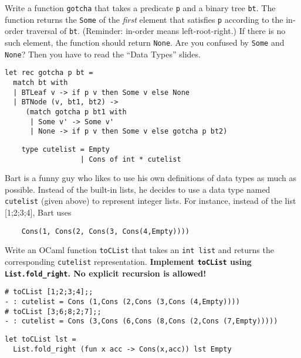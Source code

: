 \documentclass[addpoints]{exam}
\begin{document}
\begin{questions}
  \question
  Write a function \texttt{gotcha} that takes a predicate \texttt{p} and a binary tree
  \texttt{bt}. The function returns the \texttt{Some} of the \emph{first} element
  that satisfies \texttt{p} according to the in-order traversal of \texttt{bt}.
  (Reminder: in-order means left-root-right.)
  If there is no such element, the function should return \texttt{None}.
  Are you confused by \texttt{Some} and \texttt{None}?
  Then you have to read the ``Data Types'' slides.

  \begin{solutionbox}{4.5cm}
    \begin{verbatim}
let rec gotcha p bt =
  match bt with
  | BTLeaf v -> if p v then Some v else None
  | BTNode (v, bt1, bt2) ->
     (match gotcha p bt1 with
      | Some v' -> Some v'
      | None -> if p v then Some v else gotcha p bt2)
    \end{verbatim}
  \end{solutionbox}


  \vspace{1em}
  \vspace{1em}

  \begin{verbatim}
    type cutelist = Empty
                  | Cons of int * cutelist
  \end{verbatim}

  Bart is a funny guy who likes to use his own definitions
  of data types as much as possible.
  Instead of the built-in lists, he decides to use a data type
  named \texttt{cutelist} (given above) to represent integer lists.
  For instance, instead of the list [1;2;3;4], Bart uses
  \begin{verbatim}
    Cons(1, Cons(2, Cons(3, Cons(4,Empty))))
  \end{verbatim}

  \question
  Write an OCaml function \texttt{toCList} that takes
  an \texttt{int list} and returns the 
  corresponding \texttt{cutelist} representation.
  \textbf{Implement \texttt{toCList} using \texttt{List.fold\_right}.
    No explicit recursion is allowed!}
  \begin{verbatim}
# toCList [1;2;3;4];;
- : cutelist = Cons (1,Cons (2,Cons (3,Cons (4,Empty))))
# toCList [3;6;8;2;7];;
- : cutelist = Cons (3,Cons (6,Cons (8,Cons (2,Cons (7,Empty)))))
  \end{verbatim}

  \begin{solutionbox}{2cm}
    \begin{verbatim}
let toCList lst =
  List.fold_right (fun x acc -> Cons(x,acc)) lst Empty
    \end{verbatim}
  \end{solutionbox}



\end{questions}
\end{document}
